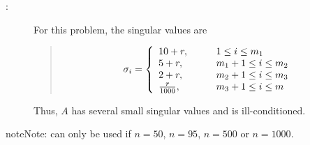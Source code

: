 \documentclass[a4paper,10pt,english]{sphinxmanual}
\begin{document}
\begin{fulllineitems}
\begin{fulllineitems}
\begin{description}
\item[{:}] \leavevmode
For this problem, the singular values are
\begin{quote}
\begin{equation*}
\begin{split}\sigma_i = \left\{ 
\begin{array}{l l}
10 + r, & \qquad 1\leq i \leq m_1\\
5 + r, & \qquad m_1+1\leq i \leq m_2\\
2 + r, & \qquad m_2+1\leq i \leq m_3\\
\frac{r}{1000}, & \qquad m_3+1\leq i\leq m
\end{array}
\right.\end{split}
\end{equation*}\end{quote}

Thus, \(A\) has several small singular values and is 
ill-conditioned.

\end{description}

\begin{sphinxadmonition}{note}{Note:}
 can only be used if \(n = 50\), 
\(n = 95\), \(n = 500\) or \(n = 1000\).
\end{sphinxadmonition}

\end{fulllineitems}


\end{fulllineitems}

\end{document}
